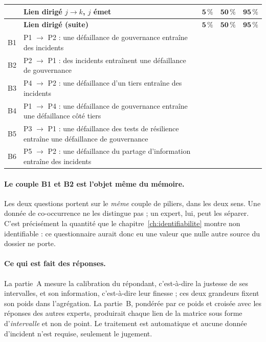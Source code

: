 {\small
\renewcommand{\arraystretch}{1.25}
\begin{longtable}{@{}l p{8.2cm} c c c@{}}
\toprule
& \textbf{Lien dirigé $j \rightarrow k$, $j$ émet} & $\mathbf{5\,\%}$ & $\mathbf{50\,\%}$ &
$\mathbf{95\,\%}$ \\
\midrule
\endfirsthead
\toprule
& \textbf{Lien dirigé (suite)} & $\mathbf{5\,\%}$ & $\mathbf{50\,\%}$ & $\mathbf{95\,\%}$ \\
\midrule
\endhead
B1 & P1 $\rightarrow$ P2 : une défaillance de gouvernance entraîne des incidents & & & \\
B2 & P2 $\rightarrow$ P1 : des incidents entraînent une défaillance de gouvernance & & & \\
B3 & P4 $\rightarrow$ P2 : une défaillance d'un tiers entraîne des incidents & & & \\
B4 & P1 $\rightarrow$ P4 : une défaillance de gouvernance entraîne une défaillance côté
     tiers & & & \\
B5 & P3 $\rightarrow$ P1 : une défaillance des tests de résilience entraîne une défaillance
     de gouvernance & & & \\
B6 & P5 $\rightarrow$ P2 : une défaillance du partage d'information entraîne des
     incidents & & & \\
\bottomrule
\end{longtable}}

\paragraph{Le couple B1 et B2 est l'objet même du mémoire.} Les deux questions portent sur le
\emph{même} couple de piliers, dans les deux sens. Une donnée de co-occurrence ne les distingue
pas ; un expert, lui, peut les séparer. C'est précisément la quantité que le
chapitre~\ref{ch:identifiabilite} montre non identifiable : ce
questionnaire aurait donc eu une valeur que nulle autre source du dossier ne porte.

\paragraph{Ce qui est fait des réponses.} La partie~A mesure la calibration du répondant, c'est-à-dire
la justesse de ses intervalles, et son information, c'est-à-dire leur finesse ; ces deux
grandeurs fixent son poids dans l'agrégation. La partie~B, pondérée par ce poids et croisée avec
les réponses des autres experts, produirait chaque lien de la matrice sous forme d'\emph{intervalle}
et non de point. Le traitement est automatique et aucune donnée d'incident n'est requise, seulement
le jugement.
